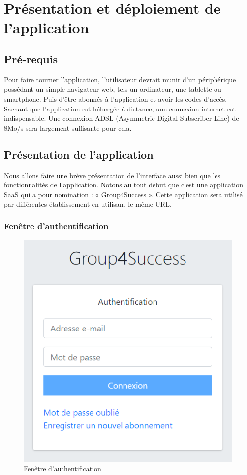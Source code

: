 \chapter{Présentation et déploiement de l'application}
\minitoc
\newpage

\section{Pré-requis}
Pour faire tourner l'application, l'utilisateur devrait munir d'un périphérique possédant un simple navigateur web, tels un ordinateur, une tablette ou smartphone. Puis d'être abonnés à l'application et avoir les codes d'accès. Sachant que l'application est hébergée à distance, une connexion internet est indispensable. Une connexion ADSL (Asymmetric Digital Subscriber Line) de 8Mo/s sera largement suffisante pour cela. 

\section{Présentation de l'application}
Nous allons faire une brève présentation de l'interface aussi bien que les fonctionnalités
de l'application. Notons au tout début que c’est une application SaaS qui a
pour nomination : « Group4Success ». Cette application sera utilisé par différentes
établissement en utilisant le même URL.

\subsection{Fenêtre d'authentification}
\begin{figure}[h]
	\centering
	\includegraphics[width=0.55\linewidth]{"Chapitre5/images/authentification"}
	\caption{Fenêtre d'authentification}
	\label{Fenêtre d'authentification}
\end{figure}

